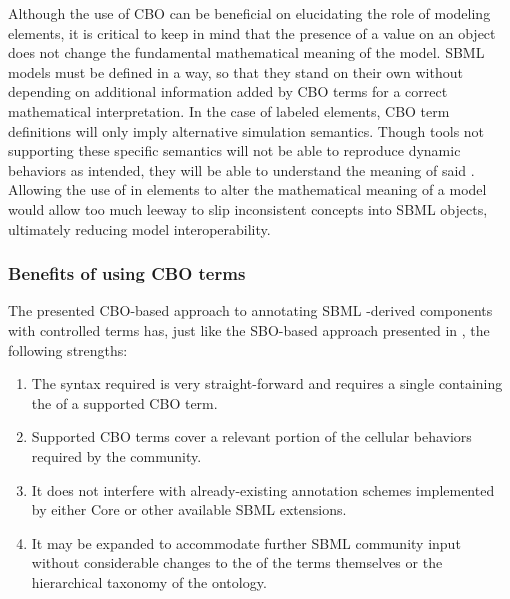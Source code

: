 Although the use of CBO can be beneficial on elucidating the role of modeling elements, it is critical to keep in mind that the presence of a  value on an object does not change the fundamental mathematical meaning of the model. SBML models must be defined in a way, so that they stand on their own without depending on additional information added by CBO terms for a correct mathematical interpretation. In the case of labeled \Event elements, CBO term definitions will only imply alternative simulation semantics. Though tools not supporting these specific \Event semantics will not be able to reproduce dynamic behaviors as intended, they will be able to understand the meaning of said \Event. Allowing the use of  in \Event elements to alter the mathematical meaning of a model would allow too much leeway to slip inconsistent concepts into SBML objects, ultimately reducing model interoperability.

\subsubsection{Benefits of using CBO terms}
\label{subsec:benefitsCBO}

The presented CBO-based approach to annotating SBML \SBase-derived components with controlled terms has, just like the SBO-based approach presented in \sbmlthreecore, the following strengths:

\begin{enumerate}
	\item The syntax required is very straight-forward and requires a single  containing the  of a supported CBO term.
	\item Supported CBO terms cover a relevant portion of the cellular behaviors required by the community.
	\item It does not interfere with already-existing annotation schemes implemented by either Core or other available SBML extensions.
	\item It may be expanded to accommodate further SBML community input without considerable changes to the  of the terms themselves or the hierarchical taxonomy of the ontology. 
\end{enumerate}

%

